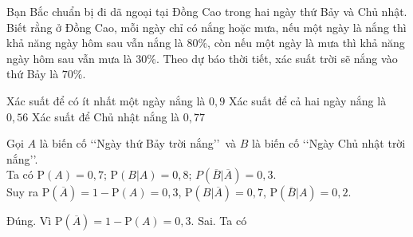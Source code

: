\begin{ex}%
	Bạn Bắc chuẩn bị đi dã ngoại tại Đồng Cao trong hai ngày thứ Bảy và Chủ nhật. Biết rằng ở Đồng Cao, mỗi ngày chỉ có nắng hoặc mưa, nếu một ngày là nắng thì khả năng ngày hôm sau vẫn nắng là $80\%$, còn nếu một ngày là mưa thì khả năng ngày hôm sau vẫn mưa là $30\%$. Theo dự báo thời tiết, xác suất trời sẽ nắng vào thứ Bảy là $70\%$. 
	\begin{center}
	\end{center}
	{Xác suất để có ít nhất một ngày nắng là $0{,}9$}
	{\True Xác suất để cả hai ngày nắng là $0{,}56$}
	{\True Xác suất để Chủ nhật nắng là $0{,}77$}
	\loigiai
	{
		Gọi $A$ là biến cố \lq\lq Ngày thứ Bảy trời nắng\rq\rq\ và $B$ là biến cố \lq\lq Ngày Chủ nhật trời nắng\rq\rq.\\
		Ta có $\mathrm{P}(A)=0{,}7$; $\mathrm{P}(B|A)= 0{,}8$; $P\left(\overline{B}\big|\overline{A}\right)= 0{,}3$.\\
		Suy ra $\mathrm{P}\left(\overline{A}\right)= 1-\mathrm{P}(A)= 0{,}3$, $\mathrm{P}\left(B|\overline{A}\right)= 0{,}7$, $\mathrm{P}\left(\overline{B}|A\right)= 0{,}2$.
		\begin{itemchoice}
			\itemch Đúng. Vì $\mathrm{P}\left(\overline{A}\right)= 1-\mathrm{P}(A)= 0{,}3$.
			\itemch Sai. Ta có
			\begin{eqnarray*}

\end{eqnarray*}
\end{itemchoice}}
\end{ex}
